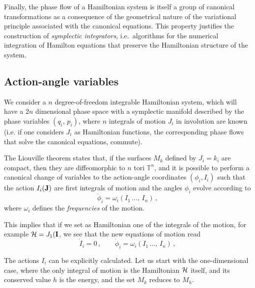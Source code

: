 Finally, the phase flow of a Hamiltonian system is itself a group of canonical transformations as a consequence of the geometrical nature of the variational principle associated with the canonical equations. This property justifies the construction of \textit{symplectic integrators}, i.e.\ algorithms for the numerical integration of Hamilton equations that preserve the Hamiltonian structure of the system.


\subsection{Action-angle variables}

We consider a $n$ degree-of-freedom integrable Hamiltonian system, which will have a $2n$ dimensional phase space with a symplectic manifold described by the phase variables $(q_i,\,p_i)$, where $n$ integrals of motion $J_i$ in involution are known (i.e. if one considers $J_i$ as Hamiltonian functions, the corresponding phase flows that solve the canonical equations, commute).

The Liouville theorem states that, if the surfaces $M_{k}$ defined by $J_i=k_i$ are compact, then they are diffeomorphic to $n$ tori $\mathbb{T}^n$, and it is possible to perform a canonical change of variables to the action-angle coordinates $(\phi_i,I_i)$ such that the action $I_i(\vb{J})$ are first integrals of motion and the angles $\phi_i$ evolve according to
\begin{equation}
    \dot{\phi}_i = \omega_i(I_1\,\dots,\,I_n)\,, 
\end{equation}
where $\omega_i$ defines the \textit{frequencies} of the motion.

This implies that if we set as Hamiltonian one of the integrals of the motion, for example $\mathcal{H}=J_1(\vb{I}$, we see that the new equations of motion read
\begin{equation} 
    \dot I_i = 0\,, \qquad \dot \phi_i = \omega_i(I_1\,\dots,\,I_n) \,,
\end{equation} 


The actions $I_i$ can be explicitly calculated. Let us start with the one-di\-men\-sio\-nal case, where the only integral of motion is the Hamiltonian $\mathcal{H}$ itself, and its conserved value $h$ is the energy, and the set $M_k$ reduces to $M_h$.


